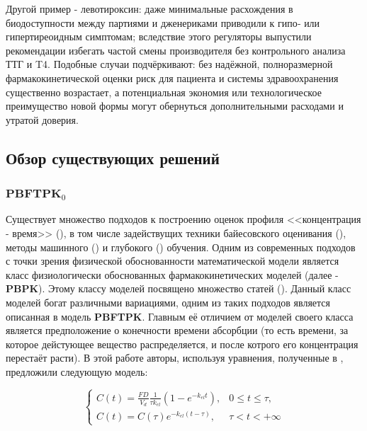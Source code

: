 \documentclass[oneside,senior,etd]{BYUPhys}
\begin{document}
Другой пример - левотироксин: даже минимальные расхождения в биодоступности между партиями и дженериками приводили к гипо‑ или гипертиреоидным симптомам; вследствие этого регуляторы выпустили рекомендации избегать частой смены производителя без контрольного анализа ТТГ и T4. Подобные случаи подчёркивают: без надёжной, полноразмерной фармакокинетической оценки риск для пациента и системы здравоохранения существенно возрастает, а потенциальная экономия или технологическое преимущество новой формы могут обернуться дополнительными расходами и утратой доверия.

\subsection{Обзор существующих решений}

\subsubsection{$\textbf{PBFTPK}_0$} \label{pbftpk0}

Существует множество подходов к построению оценок профиля <<концентрация - время>> (\cite{Gabrielsson2012, Tornoe2004, Byon2013, Huang2020, Ette2003, Calvier2017, Shargel2012, Wilkinson2012, Bonate2011, Sheiner1979, Vonesh1997, Gillespie2020}), в том числе задействущих техники байесовского оценивания (\cite{Muller2024}), методы машинного (\cite{Smith2023}) и глубокого (\cite{Zhang2024}) обучения. Одним из современных подходов с точки зрения физической обоснованности математической модели является класс физиологически обоснованных фармакокинетических моделей (далее - \textbf{PBPK}). Этому классу моделей посвящено множество статей (\cite{macheras, chryssafidis, rowland, wu, Kim2025}). Данный класс моделей богат различными вариациями, одним из таких подходов является описанная в \cite{pbftpk} модель \textbf{PBFTPK}. Главным её отличием от моделей своего класса является предположение о конечности времени абсорбции (то есть времени, за которое дейстующее вещество распределяется, и после котрого его концентрация перестаёт расти). В этой работе авторы, используя уравнения, полученные в \cite{dost}, предложили следующую модель:

\[
	\begin{cases}
		C(t) =  \frac{F D} {V_d} \frac {1}{\tau k_{el}} (1 - e^{-k_{el} t}), & 0 \leq t \leq \tau, \\
		C(t) = C(\tau) e^{-k_{el} (t - \tau)},                               & \tau < t < +\infty
	\end{cases}
\]
\end{document}
